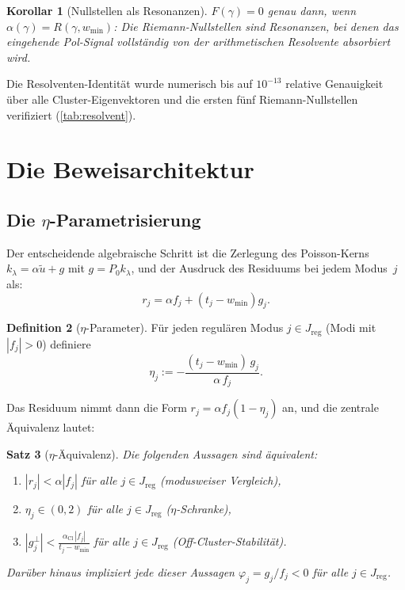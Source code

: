 \documentclass[12pt,a4paper]{article}
\newtheorem{theorem}{Satz}[section]
\newtheorem{corollary}[theorem]{Korollar}
\theoremstyle{definition}
\newtheorem{definition}[theorem]{Definition}
\theoremstyle{remark}
\newcommand{\Cl}{\mathrm{Cl}}
\newcommand{\reg}{\mathrm{reg}}
\newcommand{\utilde}{\tilde{u}}
\newcommand{\wmin}{w_{\min}}
\begin{document}
\begin{corollary}[Nullstellen als Resonanzen]
$F(\gamma) = 0$ genau dann, wenn $\alpha(\gamma) = R(\gamma, \wmin)$:
Die Riemann-Nullstellen sind \emph{Resonanzen}, bei denen das eingehende
Pol-Signal vollständig von der arithmetischen Resolvente absorbiert wird.
\end{corollary}

Die Resolventen-Identität wurde numerisch bis auf $10^{-13}$
relative Genauigkeit über alle Cluster-Eigenvektoren und die ersten fünf
Riemann-Nullstellen verifiziert (\cref{tab:resolvent}).

\section{Die Beweisarchitektur}
\label{sec:proof-arch}

\subsection{Die \texorpdfstring{$\eta$}{eta}-Parametrisierung}

Der entscheidende algebraische Schritt ist die Zerlegung des Poisson-Kerns
$k_\lambda = \alpha \utilde + g$ mit $g = P_0 k_\lambda$,
und der Ausdruck des Residuums bei jedem Modus~$j$ als:
\begin{equation}
\label{eq:residual}
r_j = \alpha f_j + (t_j - \wmin) g_j.
\end{equation}

\begin{definition}[$\eta$-Parameter]
Für jeden regulären Modus $j \in J_{\reg}$ (Modi mit $|f_j| > 0$) definiere
\begin{equation}
\label{eq:eta-def}
\eta_j := -\frac{(t_j - \wmin)\, g_j}{\alpha\, f_j}.
\end{equation}
\end{definition}

Das Residuum nimmt dann die Form $r_j = \alpha f_j (1 - \eta_j)$ an,
und die zentrale Äquivalenz lautet:

\begin{theorem}[$\eta$-Äquivalenz]
\label{thm:eta-equiv}
Die folgenden Aussagen sind äquivalent:
\begin{enumerate}[label=(\alph*)]
\item $|r_j| < \alpha |f_j|$ für alle $j \in J_{\reg}$
  \hfill (modusweiser Vergleich),
\item $\eta_j \in (0, 2)$ für alle $j \in J_{\reg}$
  \hfill ($\eta$-Schranke),
\item $|g_j^\perp| < \frac{\alpha_{\Cl}\, |f_j|}{t_j - \wmin}$
  für alle $j \in J_{\reg}$
  \hfill (Off-Cluster-Stabilität).
\end{enumerate}
Darüber hinaus impliziert jede dieser Aussagen $\varphi_j = g_j / f_j < 0$
für alle $j \in J_{\reg}$.
\end{theorem}
\end{document}
